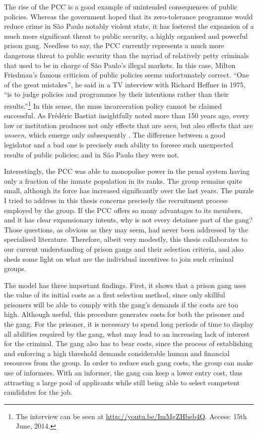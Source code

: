 The rise of the PCC is a good example of unintended consequences of public policies. Whereas the government hoped that its zero-tolerance programme would reduce crime in S\~{a}o Paulo notably violent state, it has fostered the expansion of a much more significant threat to public security, a highly organised and powerful prison gang. Needless to say, the PCC currently represents a much more dangerous threat to public security than the myriad of relatively petty criminals that used to be in charge of S\~{a}o Paulo's illegal markets. In this case, Milton Friedman's famous criticism of public policies seems unfortunately correct. ``One of the great mistakes'', he said in a TV interview with Richard Heffner in 1975, ``is to judge policies and programmes by their intentions rather than their results.''\footnote{The interview can be seen at \href{http://youtu.be/ImMgZHbeb4Q}{http://youtu.be/ImMgZHbeb4Q}. Access: 15th June, 2014.} In this sense, the mass incarceration policy cannot be claimed successful. As Fr\'{e}d\'{e}ric Bastiat insightfully noted more than 150 years ago, every law or institution produces not only effects that are \textit{seen}, but also effects that are \textit{unseen}, which emerge only subsequently \citep[]{bastiat1995selected}. The difference between a good legislator and a bad one is precisely such ability to foresee such unexpected results of public policies; and in S\~{a}o Paulo they were not.

Interestingly, the PCC was able to monopolise power in the penal system having only a fraction of the inmate population in its ranks. The group remains quite small, although its force has increased significantly over the last years. The puzzle I tried to address in this thesis concerns precisely the recruitment process employed by the group. If the PCC offers so many advantages to its members, and it has clear expansionary intents, why is not every detainee part of the gang? Those questions, as obvious as they may seem, had never been addressed by the specialised literature.  Therefore, albeit very modestly, this thesis collaborates to our current understanding of prison gangs and their selection criteria, and also sheds some light on what are the individual incentives to join such criminal groups.

The model has three important findings. First, it shows that a prison gang uses the value of its initial costs as a first selection method, since only skillful prisoners will be able to comply with the gang's demands if the costs are too high. Although useful, this procedure generates costs for both the prisoner and the gang. For the prisoner, it is necessary to spend long periods of time to display all abilities required by the gang, what may lead to an increasing lack of interest for the criminal. The gang also has to bear costs, since the process of establishing and enforcing a high threshold demands considerable human and financial resources from the group. In order to reduce such gang costs, the group can make use of informers. With an informer, the gang can keep a lower entry cost, thus attracting a large pool of applicants while still being able to select competent candidates for the job. 


